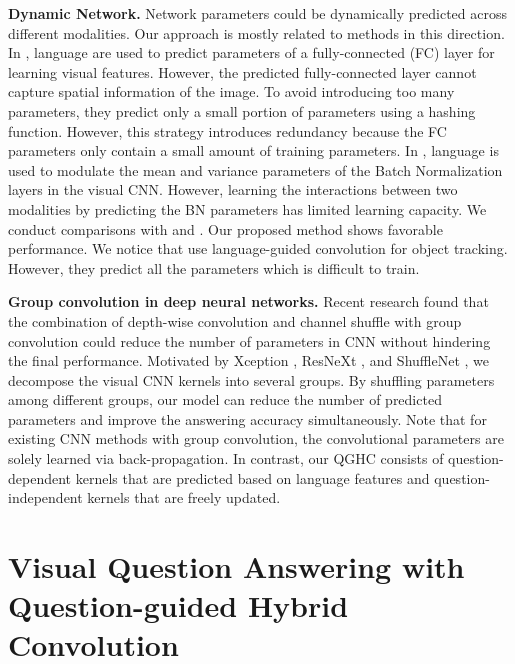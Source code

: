\documentclass[runningheads]{llncs}
\begin{document}
\textbf{Dynamic Network.} Network parameters could be dynamically predicted across different modalities.
Our approach is mostly related to methods in this direction. In \cite{noh2016image}, language are used to predict parameters of a fully-connected (FC) layer for learning visual features. However, the predicted fully-connected layer cannot capture spatial information of the image. To avoid introducing too many parameters, they predict only a small portion of parameters using a hashing function. However, this strategy introduces redundancy because the FC parameters only contain a small amount of training parameters. In \cite{de2017modulating}, language is used to modulate the mean and variance parameters of the Batch Normalization layers in the visual CNN. However, learning the interactions between two modalities by predicting the BN parameters has limited learning capacity. 
We conduct comparisons with \cite{noh2016image} and \cite{de2017modulating}. Our proposed method shows favorable performance. We notice that \cite{li2017tracking} use language-guided convolution for object tracking. However, they predict all the parameters which is difficult to train.

\textbf{Group convolution in deep neural networks.} 
Recent research found that the combination of depth-wise convolution and channel shuffle with group convolution could reduce the number of parameters in CNN without hindering the final performance. Motivated by Xception \cite{chollet2016xception}, ResNeXt \cite{xie2016aggregated}, and ShuffleNet \cite{zhang2017shufflenet}, we decompose the visual CNN kernels into several groups. By shuffling parameters among different groups, our model can reduce the number of predicted parameters and improve the answering accuracy simultaneously. Note that for existing CNN methods with group convolution, the convolutional parameters are solely learned via back-propagation. In contrast, our QGHC consists of question-dependent kernels that are predicted based on language features and question-independent kernels that are freely updated.


\section{Visual Question Answering with Question-guided Hybrid Convolution}
\label{sec:approach}
\end{document}
